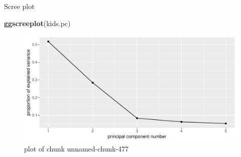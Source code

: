 \documentclass[ignorenonframetext,]{beamer}
\newenvironment{Shaded}{\begin{snugshade}}{\end{snugshade}}
\newcommand{\KeywordTok}[1]{\textcolor[rgb]{0.13,0.29,0.53}{\textbf{#1}}}
\newcommand{\NormalTok}[1]{#1}
\begin{document}
\begin{frame}[fragile]{Scree plot}
\protect\hypertarget{scree-plot-3}{}

\begin{Shaded}
\begin{Highlighting}[]
\KeywordTok{ggscreeplot}\NormalTok{(kids.pc)}
\end{Highlighting}
\end{Shaded}

\begin{figure}
\centering
\includegraphics{figure/unnamed-chunk-477-1.pdf}
\caption{plot of chunk unnamed-chunk-477}
\end{figure}

\end{frame}
\end{document}

